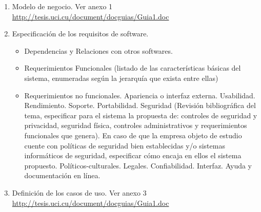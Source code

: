 \begin{enumerate}
\begin{itemize}
	\end{itemize}
 \item Modelo de negocio. Ver anexo 1 \url{http://tesis.uci.cu/document/docguias/Guia1.doc}
 \item Especificación de los requisitos de software.
	\begin{itemize}
	 \item Dependencias y Relaciones con otros softwares. 
	 \item Requerimientos Funcionales (listado de las características básicas del sistema, enumeradas según la jerarquía que exista entre ellas)
	 \item Requerimientos no funcionales. Apariencia o interfaz externa.
		\subitem Usabilidad.
		\subitem Rendimiento.
		\subitem Soporte.
		\subitem Portabilidad. 
		\subitem Seguridad (Revisión bibliográfica del tema, especificar para el sistema la propuesta de: controles de seguridad y privacidad, seguridad física, controles administrativos y requerimientos funcionales que genera). En caso de que la empresa objeto de estudio cuente con políticas de seguridad bien establecidas y/o sistemas informáticos de seguridad, especificar cómo encaja en ellos el sistema propuesto.
		\subitem Políticos-culturales.
		\subitem Legales.
		\subitem Confiabilidad.
		\subitem Interfaz.
		\subitem Ayuda y documentación en línea.
      \end{itemize}
 \item Definición de los casos de uso. Ver anexo 3 \url{http://tesis.uci.cu/document/docguias/Guia1.doc}
\end{enumerate}
